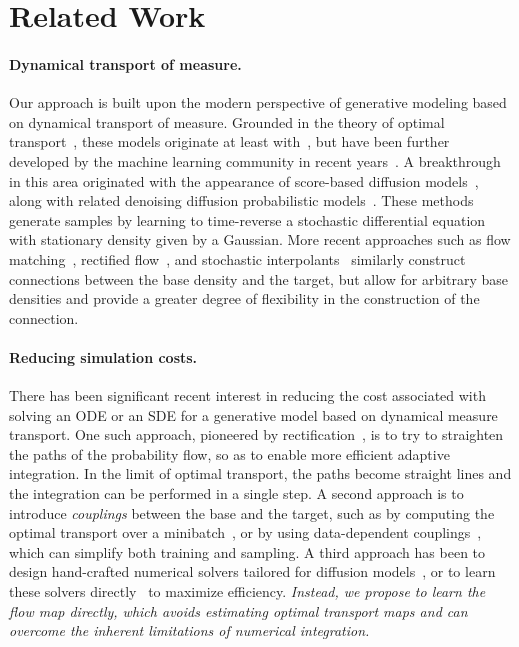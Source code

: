 \section{Related Work}
\label{sec:related}
%
\paragraph{Dynamical transport of measure.}
Our approach is built upon the modern perspective of generative modeling based on dynamical transport of measure.
%
Grounded in the theory of optimal transport~\citep{villani2009optimal, benamou2000computational, santambrogio2015optimal}, these models originate at least with~\citep{tabak_density_2010, tabak2013}, but have been further developed by the machine learning community in recent years~\citep{rezende_variational_2015, dinh_density_2017, grathwohl_ffjord, chen_neural_2019}.
%
A breakthrough in this area originated with the appearance of score-based diffusion models~\citep{song2020score, song_improved_2020, song_generative_2020}, along with related denoising diffusion probabilistic models~\citep{ho2020denoising, sohldickstein2015deep}.
%
These methods generate samples by learning to time-reverse a stochastic differential equation with stationary density given by a Gaussian.
%
More recent approaches such as flow matching~\citep{lipman2022flow}, rectified flow~\citep{liu2022flow, liu2022let}, and stochastic interpolants~\citep{albergo2022building, albergo2023stochastic, ma_sit_2024, chen_probabilistic_2024} similarly construct connections between the base density and the target, but allow for arbitrary base densities and provide a greater degree of flexibility in the construction of the connection.

\paragraph{Reducing simulation costs.}
%
There has been significant recent interest in reducing the cost associated with solving an ODE or an SDE for a generative model based on dynamical measure transport.
%
One such approach, pioneered by rectification~\citep{liu2022flow, liu2022let}, is to try to straighten the paths of the probability flow, so as to enable more efficient adaptive integration.
%
In the limit of optimal transport, the paths become straight lines and the integration can be performed in a single step.
%
A second approach is to introduce \textit{couplings} between the base and the target, such as by computing the optimal transport over a minibatch~\citep{pooladian2023multisample, tong_improving_2023}, or by using data-dependent couplings~\citep{albergo_stochastic_dd_2023}, which can simplify both training and sampling.
%
A third approach has been to design hand-crafted numerical solvers tailored for diffusion models~\citep{karras_elucidating_2022, zhang_fast_2023, jolicoeur-martineau_gotta_2021, liu_pseudo_2022, lu_dpm-solver_nodate}, or to learn these solvers directly~\citep{watson_learning_2021, watson_learning_2022, nichol_improved_2021} to maximize efficiency.
%
\textit{Instead, we propose to learn the flow map directly, which avoids estimating optimal transport maps and can overcome the inherent limitations of numerical integration.}


